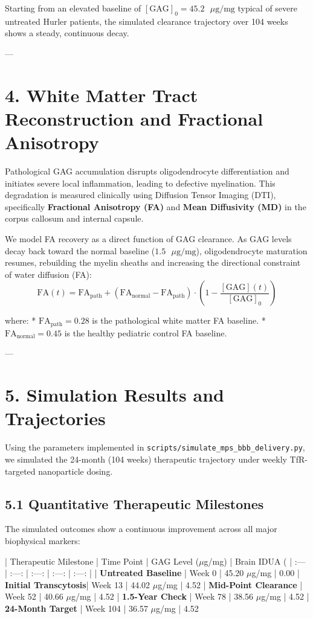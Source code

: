 \documentclass[11pt,twocolumn]{article}
\begin{document}
Starting from an elevated baseline of $[\text{GAG}]_0 = 45.2 \text{ }\mu\text{g/mg}$ typical of severe untreated Hurler patients, the simulated clearance trajectory over 104 weeks shows a steady, continuous decay.

---

\section{4. White Matter Tract Reconstruction and Fractional Anisotropy}
Pathological GAG accumulation disrupts oligodendrocyte differentiation and initiates severe local inflammation, leading to defective myelination. This degradation is measured clinically using Diffusion Tensor Imaging (DTI), specifically \textbf{Fractional Anisotropy (FA)} and \textbf{Mean Diffusivity (MD)} in the corpus callosum and internal capsule.

We model FA recovery as a direct function of GAG clearance. As GAG levels decay back toward the normal baseline ($1.5\text{ }\mu\text{g/mg}$), oligodendrocyte maturation resumes, rebuilding the myelin sheaths and increasing the directional constraint of water diffusion (FA):
$$\text{FA}(t) = \text{FA}_{\text{path}} + \left(\text{FA}_{\text{normal}} - \text{FA}_{\text{path}}\right) \cdot \left( 1 - \frac{[\text{GAG}](t)}{[\text{GAG}]_0} \right)$$

where:
*   $\text{FA}_{\text{path}} = 0.28$ is the pathological white matter FA baseline.
*   $\text{FA}_{\text{normal}} = 0.45$ is the healthy pediatric control FA baseline.

---

\section{5. Simulation Results and Trajectories}
Using the parameters implemented in \texttt{scripts/simulate_mps_bbb_delivery.py}, we simulated the 24-month (104 weeks) therapeutic trajectory under weekly TfR-targeted nanoparticle dosing.

\subsection{5.1 Quantitative Therapeutic Milestones}
The simulated outcomes show a continuous improvement across all major biophysical markers:

| Therapeutic Milestone | Time Point | GAG Level ($\mu$g/mg) | Brain IDUA (%
| :--- | :---: | :---: | :---: | :---: |
| \textbf{Untreated Baseline} | Week 0 | 45.20 $\mu$g/mg | 0.00%
| \textbf{Initial Transcytosis}| Week 13 | 44.02 $\mu$g/mg | 4.52%
| \textbf{Mid-Point Clearance} | Week 52 | 40.66 $\mu$g/mg | 4.52%
| \textbf{1.5-Year Check} | Week 78 | 38.56 $\mu$g/mg | 4.52%
| \textbf{24-Month Target} | Week 104 | 36.57 $\mu$g/mg | 4.52%
\end{document}
